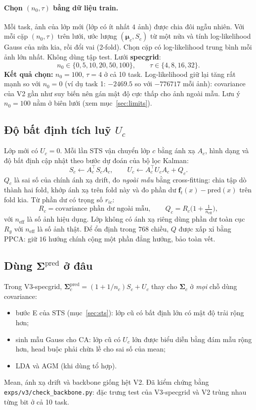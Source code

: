 \documentclass[11pt]{article}
\newcommand{\bmu}{\boldsymbol{\mu}}
\newcommand{\bSigma}{\boldsymbol{\Sigma}}
\newcommand{\vf}{\mathbf{f}}
\begin{document}
\paragraph{Chọn $(n_0,\tau)$ bằng dữ liệu train.} Mỗi task, ảnh của lớp mới (lớp có ít nhất $4$ ảnh) được chia đôi ngẫu
nhiên. Với mỗi cặp $(n_0,\tau)$ trên lưới, ước lượng $(\bmu_c,S_c)$ từ một nửa và tính log-likelihood Gauss của nửa kia,
rồi đổi vai (2-fold). Chọn cặp có log-likelihood trung bình mỗi ảnh lớn nhất. Không dùng tập test. Lưới
\textbf{specgrid}:
\[
n_0\in\{0,5,10,20,50,100\},\qquad \tau\in\{4,8,16,32\}.
\]
\textbf{Kết quả chọn:} $n_0=100$, $\tau=4$ ở cả 10 task. Log-likelihood giữ lại tăng rất mạnh so với $n_0=0$ (ví dụ task
1: $-2469.5$ so với $-776717$ mỗi ảnh): covariance của V2 gần như suy biến nên gán mật độ cực thấp cho ảnh ngoài mẫu.
Lưu ý $n_0=100$ nằm ở biên lưới (xem mục~\ref{sec:limits}).

\subsection{Độ bất định tích luỹ $U_c$}\label{sec:v3-u}
Lớp mới có $U_c=0$. Mỗi lần STS vận chuyển lớp $c$ bằng ánh xạ $A_c$, hình dạng và độ bất định cập nhật theo bước dự
đoán của bộ lọc Kalman:
\begin{equation}
S_c\leftarrow A_c^\top S_cA_c,\qquad U_c\leftarrow A_c^\top U_cA_c+Q_c.
\end{equation}
$Q_c$ là sai số của chính ánh xạ drift, đo \emph{ngoài mẫu} bằng cross-fitting: chia tập dò thành hai fold, khớp ánh xạ
trên fold này và đo phần dư $\vf_t(x)-\mathrm{pred}(x)$ trên fold kia. Từ phần dư có trọng số $r_{ic}$:
\begin{equation}
R_c=\text{covariance phần dư ngoài mẫu},\qquad Q_c=R_c\Big(1+\tfrac1{n_{\text{eff}}}\Big),
\end{equation}
với $n_{\text{eff}}$ là số ảnh hiệu dụng. Lớp không có ánh xạ riêng dùng phần dư toàn cục $R_g$ với $n_{\text{eff}}$ là
số ảnh thật. Để ổn định trong $768$ chiều, $Q$ được xấp xỉ bằng PPCA: giữ $16$ hướng chính cộng một phần đẳng hướng,
bảo toàn vết.

\subsection{Dùng $\bSigma^{\text{pred}}$ ở đâu}\label{sec:v3-pred}
Trong V3-specgrid, $\bSigma^{\text{pred}}_c=(1+1/n_c)S_c+U_c$ thay cho $\bSigma_c$ ở \emph{mọi} chỗ dùng covariance:
\begin{itemize}
\item bước E của STS (mục~\ref{sec:sts}): lớp cũ có bất định lớn có mật độ trải rộng hơn;
\item sinh mẫu Gauss cho CA: lớp cũ có $U_c$ lớn được biểu diễn bằng đám mẫu rộng hơn, head buộc phải chừa lề cho sai số
      của mean;
\item LDA và AGM (khi dùng tổ hợp).
\end{itemize}
Mean, ánh xạ drift và backbone giống hệt V2. Đã kiểm chứng bằng \texttt{exps/v3/check\_backbone.py}: đặc trưng test của
V3-specgrid và V2 trùng nhau từng bit ở cả 10 task.
\end{document}
